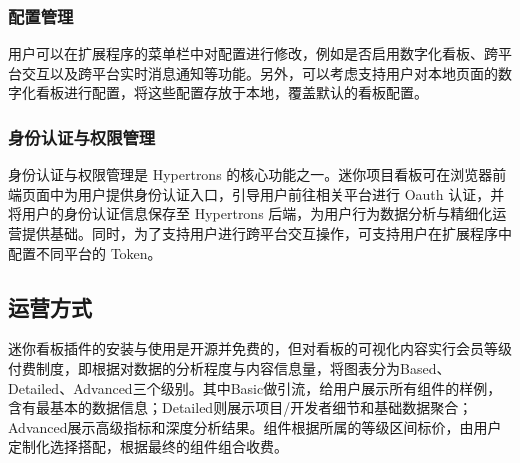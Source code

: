\subsubsection{配置管理}
\par 用户可以在扩展程序的菜单栏中对配置进行修改，例如是否启用数字化看板、跨平台交互以及跨平台实时消息通知等功能。另外，可以考虑支持用户对本地页面的数字化看板进行配置，将这些配置存放于本地，覆盖默认的看板配置。

\subsubsection{身份认证与权限管理}
\par 身份认证与权限管理是 Hypertrons 的核心功能之一。迷你项目看板可在浏览器前端页面中为用户提供身份认证入口，引导用户前往相关平台进行 Oauth 认证，并将用户的身份认证信息保存至 Hypertrons 后端，为用户行为数据分析与精细化运营提供基础。同时，为了支持用户进行跨平台交互操作，可支持用户在扩展程序中配置不同平台的 Token。


\subsection{运营方式}
\par 迷你看板插件的安装与使用是开源并免费的，但对看板的可视化内容实行会员等级付费制度，即根据对数据的分析程度与内容信息量，将图表分为Based、Detailed、Advanced三个级别。其中Basic做引流，给用户展示所有组件的样例，含有最基本的数据信息；Detailed则展示项目/开发者细节和基础数据聚合；Advanced展示高级指标和深度分析结果。组件根据所属的等级区间标价，由用户定制化选择搭配，根据最终的组件组合收费。

